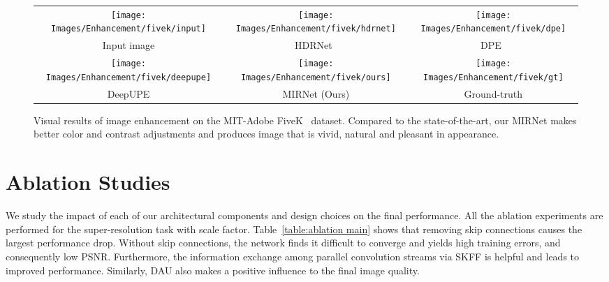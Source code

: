 \documentclass[runningheads]{llncs}
\begin{document}
\begin{figure}[!t]
  \begin{center}
    \tiny
    \begin{tabular}{ccc}\texttt{[image: Images/Enhancement/fivek/input]}&\hspace{-1.5mm}
      \texttt{[image: Images/Enhancement/fivek/hdrnet]}&\hspace{-1.5mm}
      \texttt{[image: Images/Enhancement/fivek/dpe]}\hspace{-1.5mm}
      \vspace{0.3mm}
      \\
      \vspace{0.5mm}
      Input image & HDRNet~\cite{Gharbi2017} & DPE~\cite{chen2018deep} \\
      \texttt{[image: Images/Enhancement/fivek/deepupe]}&\hspace{-1.5mm}
      \texttt{[image: Images/Enhancement/fivek/ours]}&\hspace{-1.5mm}
      \texttt{[image: Images/Enhancement/fivek/gt]}\hspace{-1.5mm}
      \vspace{0.3mm}
      \\
      \vspace{0.5mm}
       DeepUPE \cite{wei2018deep} & MIRNet (Ours)  & Ground-truth

    \end{tabular}
  \end{center}\vspace{-2em}
    \caption{\small Visual results of image enhancement on the MIT-Adobe FiveK~\cite{mit_fivek} dataset. 
Compared to the state-of-the-art, our MIRNet makes better color and contrast adjustments and produces image that is vivid, natural and pleasant in appearance. }
      \vspace{-1em}
    \label{Fig:qual_fivek}\vspace{-0em}
\end{figure}


\section{Ablation Studies}
We study the impact of each of our architectural components and design choices on the final performance. All the ablation experiments are performed for the super-resolution task with  scale factor. 
Table~\ref{table:ablation main} shows that removing skip connections causes the largest performance drop. Without skip connections, the network finds it difficult to converge and yields high training errors, and consequently low PSNR.
Furthermore, the information exchange among parallel convolution streams via SKFF is helpful and leads to improved performance. 
Similarly, DAU also makes a positive influence to the final image quality. 
\end{document}

